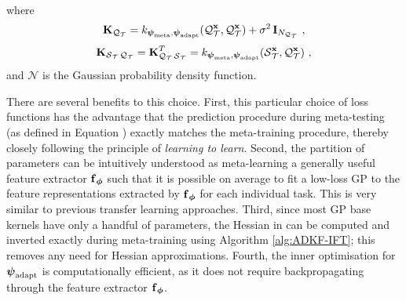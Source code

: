\begin{itemize}
\begin{equation}
\begin{split}
        \end{split}
        \end{equation}
        where
        \begin{equation*}
            \bfK_{\query_{\task}}=k_{\psimeta,\psiml}(\query^{\bfx}_{\task},\query^{\bfx}_{\task})+\sigma^2\bfI_{N_{\query_{\task}}}\ ,
        \end{equation*}
        \begin{equation*}
            \bfK_{\support_{\task}\query_{\task}}=\bfK_{\query_{\task}\support_{\task}}^T=k_{\psimeta,\psiml}(\support_{\task}^{\bfx},\query_{\task}^{\bfx})\ ,
        \end{equation*}
        and $\mathcal N$ is the Gaussian probability density function.

    \end{itemize}
    
    There are several benefits to this choice.
    First,
    this particular choice of loss functions has the advantage that the prediction procedure during meta-testing (as defined in Equation )
    exactly matches the meta-training procedure,
    thereby closely following the principle of \emph{learning to learn}. 
    Second, 
    the partition of parameters can be intuitively understood as 
    meta-learning a generally useful feature extractor $\operatorname{\mathbf{f}}_{\operatorname{\boldsymbol{\phi}}}$
    such that it is possible on average to fit a low-loss GP to the feature representations extracted by $\operatorname{\mathbf{f}}_{\operatorname{\boldsymbol{\phi}}}$ for each individual task.
    This is very similar to previous transfer learning approaches.
    Third, 
    since most GP base kernels have only a handful of parameters,
    the Hessian in  can be computed and inverted exactly
    during meta-training using Algorithm \ref{alg:ADKF-IFT};
    this removes any need for Hessian approximations.
    Fourth,
    the inner optimisation  for $\operatorname{\boldsymbol{\psi}}_{\text{adapt}}$ is computationally efficient,
    as it does not require backpropagating through the
    feature extractor $\operatorname{\mathbf{f}}_{\operatorname{\boldsymbol{\phi}}}$.
    
